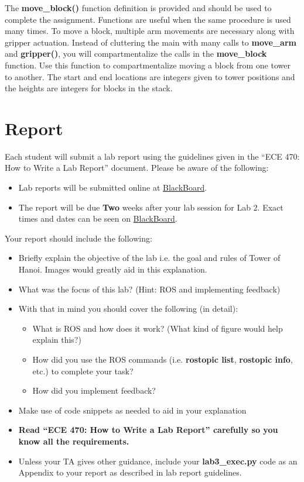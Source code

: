 The \textbf{move\_block()} function definition is provided and should be used to complete the assignment. Functions are useful when the same procedure is used many
times.  To move a block, multiple arm movements are necessary along with gripper
actuation. Instead of cluttering the main with many calls to \textbf{move\_arm} and \textbf{gripper()}, you will compartmentalize the calls in the \textbf{move\_block} function.
Use this function to compartmentalize moving a block from one tower to another. 
The start and end locations are integers given to tower positions and the heights are integers for blocks in the stack.



\section{Report}
Each student will submit a lab report using the guidelines given in the “ECE 470: How to Write a Lab Report” document.  Please be aware of the following:
\begin{itemize}
    \item Lab reports will be submitted online at \href{https://learn.intl.zju.edu.cn/webapps/login/}{BlackBoard}.
    \item The report will be due \textbf{Two} weeks after your lab session for Lab 2.  Exact times and dates can be seen on \href{https://learn.intl.zju.edu.cn/webapps/login/}{BlackBoard}.

\end{itemize}
Your report should include the following:
\begin{itemize}	
	\item Briefly explain the objective of the lab i.e. the goal and rules of Tower of Hanoi.  Images would greatly aid in this explanation.
	\item What was the focus of this lab? (Hint: ROS and implementing feedback)
	\item With that in mind you should cover the following (in detail):
	\begin{itemize}
		\item What is ROS and how does it work? (What kind of figure would help explain this?)
		\item How did you use the ROS commands (i.e. \textbf{rostopic list}, \textbf{rostopic info}, etc.) to complete your task?
		\item How did you implement feedback?
	\end{itemize}
	\item Make use of code snippets as needed to aid in your explanation
	\item \textbf{Read “ECE 470: How to Write a Lab Report” carefully so you know all the requirements.}
	\item Unless your TA gives other guidance, include your \textbf{lab3\_exec.py} code as an Appendix to your report	as described in lab report guidelines.
\end{itemize}

